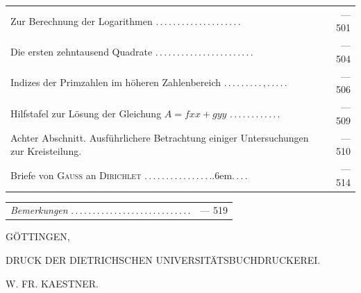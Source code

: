 \begin{longtable}{@{}>{\raggedright\arraybackslash}p{.86\linewidth}@{\quad}r@{}}
Zur Berechnung der Logarithmen .\,.\,.\,.\,.\,.\,.\,.\,.\,.\,.\,.\,.\,.\,.\,.\,.\,.\,.\,. & — 501 \\[3pt]
Die ersten zehntausend Quadrate .\,.\,.\,.\,.\,.\,.\,.\,.\,.\,.\,.\,.\,.\,.\,.\,.\,.\,.\,.\,.\,.\,. & — 504 \\[3pt]
Indizes der Primzahlen im höheren Zahlenbereich .\,.\,.\,.\,.\,.\,.\,.\,.\,,\,.\,.\,.\,.\,. & — 506 \\[3pt]
Hilfstafel zur Lösung der Gleichung $A=fxx+gyy$ .\,.\,.\,.\,.\,.\,.\,.\,.\,.\,.\,. & — 509 \\[3pt]
Achter Abschnitt. Ausführlichere Betrachtung einiger Untersuchungen zur Kreisteilung.  & — 510 \\[3pt]
Briefe von \textsc{Gauss} an \textsc{Dirichlet} .\,.\,.\,.\,.\,.\,.\,.\,.\,.\,.\,.\,.\,.\,.\,.\kern.6em.\,.\,.\,. & — 514 \\[3pt]
\end{longtable}\endgroup
\begingroup\fontsize{10}{13}\selectfont
\begin{longtable}{@{}>{\raggedright\arraybackslash}p{.86\linewidth}@{\quad}r@{}}
\textit{Bemerkungen} .\,.\,.\,.\,.\,.\,.\,.\,.\,.\,.\,.\,.\,.\,.\,.\,.\,.\,.\,.\,.\,.\,.\,.\,.\,.\,.\,. & — 519 \\[3pt]
\end{longtable}\endgroup
{}
\begin{center}
GÖTTINGEN,\par\smallskip
DRUCK DER DIETRICHSCHEN UNIVERSITÄTSBUCHDRUCKEREI.\par\smallskip
W. FR. KAESTNER.
\end{center}
